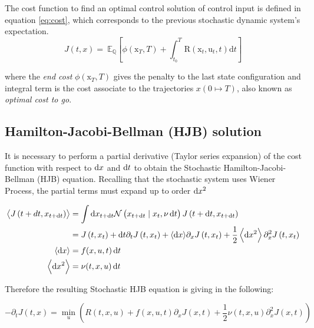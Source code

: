 \documentclass[]{hdsr}
\begin{document}
The cost function to find an optimal control solution of control input is defined in equation \ref{eq:cost}, which corresponds to the previous stochastic dynamic system's expectation. 
\begin{equation}
J(t,x) = \: \mathbb{E}_{\mathbb{Q}}\left[\phi\left(\mathrm{x}_{T}, T\right)+\int_{t_{0}}^{T} \mathrm{R}\left(\mathrm{x}_{t},\mathrm{u}_{t}, t\right) \mathrm{d} t\right]
\label{eq:cost}
\end{equation}

where the \textit{end cost} $\phi\left(\mathrm{x}_{T}, T\right)$ gives the penalty to the last state configuration and integral term is the cost associate to the trajectories $x(0\longmapsto T)$, also known as \textit{optimal cost to go}. 

\subsection{Hamilton-Jacobi-Bellman (HJB) solution}

It is necessary to perform a partial derivative (Taylor series expansion) of the cost function with respect to $\dif x$ and $\dif t$ to obtain the Stochastic Hamilton-Jacobi-Bellman (HJB) equation. Recalling that the stochastic system uses Wiener Process, the partial terms must expand up to order $\dif x^2$

\begin{equation}
\begin{aligned}
\left\langle J\left(t+d t, x_{t+\dif t}\right)\right\rangle &=\int \dif x_{t+\dif t} \mathcal{N}\left(x_{t+\dif t} \mid x_{t}, \nu \dif t\right) J\left(t+\dif t, x_{t+\dif t}\right) \\
&=J\left(t, x_{t}\right)+\dif t \partial_{t} J\left(t, x_{t}\right)+\langle \dif x\rangle \partial_{x} J\left(t, x_{t}\right)+\frac{1}{2}\left\langle \dif x^{2}\right\rangle \partial_{x}^{2} J\left(t, x_{t}\right) \\
\langle \dif x\rangle &=f(x, u, t) \dif t \\
\left\langle \dif x^{2}\right\rangle &=\nu(t, x, u) \dif t
\end{aligned}
\end{equation}

Therefore the resulting Stochastic HJB equation is giving in the following:

\begin{equation}
-\partial_{t} J(t, x)=\min _{u}\left(R(t, x, u)+f(x, u, t) \partial_{x} J(x, t)+\frac{1}{2} \nu(t, x, u) \partial_{x}^{2} J(x, t)\right) \label{eq:hjb}
\end{equation}
\end{document}
